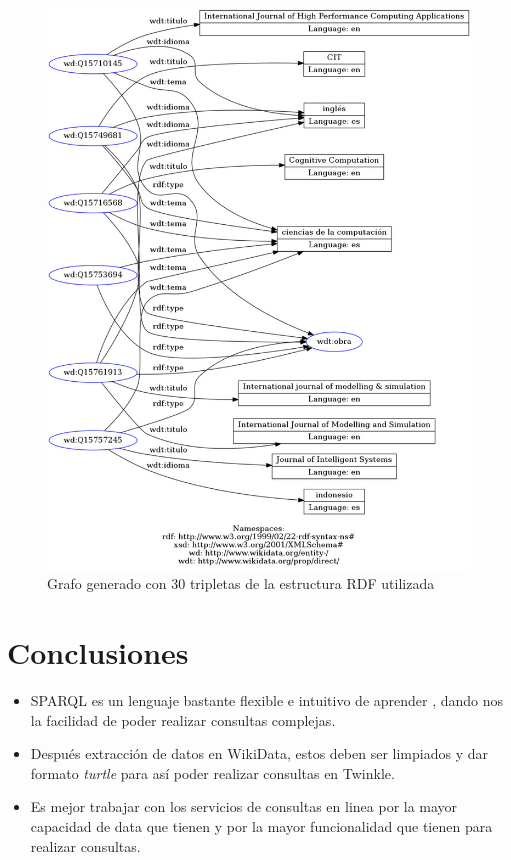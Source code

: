 \documentclass[conference]{IEEEtran}
\begin{document}
\begin{figure}[H]
\includegraphics[scale=0.25]{imagenes/grafo_rdf_30.jpeg} 
\caption{Grafo generado con 30 tripletas de la estructura RDF utilizada \cite{b2}}
\end{figure} 

\vspace{0.2cm}

\newpage

\section{Conclusiones}

\begin{itemize}
\item  SPARQL es un lenguaje bastante flexible e intuitivo de aprender , dando nos la facilidad de poder realizar consultas complejas. 
\item Después extracción de datos en WikiData, estos deben ser limpiados y dar formato \textit{turtle} para así poder realizar consultas en Twinkle.
\item Es mejor trabajar con los servicios  de consultas en linea por la mayor capacidad de data que tienen y por la mayor funcionalidad que tienen para realizar consultas.

\end{itemize}
\end{document}
